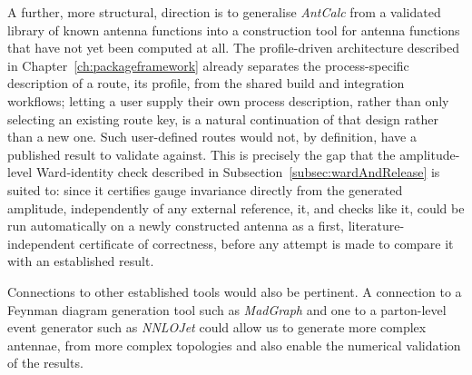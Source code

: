 A further, more structural, direction is to generalise \textit{AntCalc} from a validated library
of known antenna functions into a construction tool for antenna functions that have not yet been
computed at all. The profile-driven architecture described in Chapter~\ref{ch:packageframework}
already separates the process-specific description of a route, its profile, from the shared build
and integration workflows; letting a user supply their own process description, rather than only
selecting an existing route key, is a natural continuation of that design rather than a new one.
Such user-defined routes would not, by definition, have a published result to validate against.
This is precisely the gap that the amplitude-level Ward-identity check described in
Subsection~\ref{subsec:wardAndRelease} is suited to: since it certifies gauge invariance directly from
the generated amplitude, independently of any external reference, it, and checks like it, could be
run automatically on a newly constructed antenna as a first, literature-independent certificate of
correctness, before any attempt is made to compare it with an established result.

Connections to other established tools would also be pertinent. A connection to a 
Feynman diagram generation tool such as \textit{MadGraph} \cite{Madgraph} and one to a parton-level 
event generator
such as \textit{NNLOJet} \cite{Nnlojet} could allow us to generate more complex 
antennae, from more complex topologies and also enable the numerical validation 
of the results. 